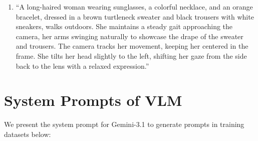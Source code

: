 \documentclass{llmxive}
\begin{document}
\begin{enumerate}
% 
\item ``A long-haired woman wearing sunglasses, a colorful necklace, and an orange bracelet, dressed in a brown turtleneck sweater and black trousers with white sneakers, walks outdoors. She maintains a steady gait approaching the camera, her arms swinging naturally to showcase the drape of the sweater and trousers. The camera tracks her movement, keeping her centered in the frame. She tilts her head slightly to the left, shifting her gaze from the side back to the lens with a relaxed expression.''
\end{enumerate}



\section{System Prompts of VLM}
\label{sec:system_prompt}
% 
We present the system prompt for Gemini-3.1 to generate prompts in training datasets below:
% 
\end{document}
